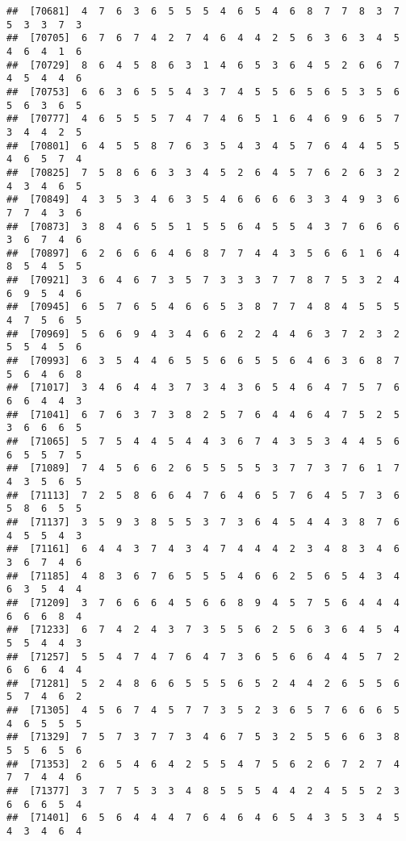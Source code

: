 \documentclass[
]{book}
\begin{document}
\begin{verbatim}
##  [70681]  4  7  6  3  6  5  5  5  4  6  5  4  6  8  7  7  8  3  7  5  3  3  7  3
##  [70705]  6  7  6  7  4  2  7  4  6  4  4  2  5  6  3  6  3  4  5  4  6  4  1  6
##  [70729]  8  6  4  5  8  6  3  1  4  6  5  3  6  4  5  2  6  6  7  4  5  4  4  6
##  [70753]  6  6  3  6  5  5  4  3  7  4  5  5  6  5  6  5  3  5  6  5  6  3  6  5
##  [70777]  4  6  5  5  5  7  4  7  4  6  5  1  6  4  6  9  6  5  7  3  4  4  2  5
##  [70801]  6  4  5  5  8  7  6  3  5  4  3  4  5  7  6  4  4  5  5  4  6  5  7  4
##  [70825]  7  5  8  6  6  3  3  4  5  2  6  4  5  7  6  2  6  3  2  4  3  4  6  5
##  [70849]  4  3  5  3  4  6  3  5  4  6  6  6  6  3  3  4  9  3  6  7  7  4  3  6
##  [70873]  3  8  4  6  5  5  1  5  5  6  4  5  5  4  3  7  6  6  6  3  6  7  4  6
##  [70897]  6  2  6  6  6  4  6  8  7  7  4  4  3  5  6  6  1  6  4  8  5  4  5  5
##  [70921]  3  6  4  6  7  3  5  7  3  3  3  7  7  8  7  5  3  2  4  6  9  5  4  6
##  [70945]  6  5  7  6  5  4  6  6  5  3  8  7  7  4  8  4  5  5  5  4  7  5  6  5
##  [70969]  5  6  6  9  4  3  4  6  6  2  2  4  4  6  3  7  2  3  2  5  5  4  5  6
##  [70993]  6  3  5  4  4  6  5  5  6  6  5  5  6  4  6  3  6  8  7  5  6  4  6  8
##  [71017]  3  4  6  4  4  3  7  3  4  3  6  5  4  6  4  7  5  7  6  6  6  4  4  3
##  [71041]  6  7  6  3  7  3  8  2  5  7  6  4  4  6  4  7  5  2  5  3  6  6  6  5
##  [71065]  5  7  5  4  4  5  4  4  3  6  7  4  3  5  3  4  4  5  6  6  5  5  7  5
##  [71089]  7  4  5  6  6  2  6  5  5  5  5  3  7  7  3  7  6  1  7  4  3  5  6  5
##  [71113]  7  2  5  8  6  6  4  7  6  4  6  5  7  6  4  5  7  3  6  5  8  6  5  5
##  [71137]  3  5  9  3  8  5  5  3  7  3  6  4  5  4  4  3  8  7  6  4  5  5  4  3
##  [71161]  6  4  4  3  7  4  3  4  7  4  4  4  2  3  4  8  3  4  6  3  6  7  4  6
##  [71185]  4  8  3  6  7  6  5  5  5  4  6  6  2  5  6  5  4  3  4  6  3  5  4  4
##  [71209]  3  7  6  6  6  4  5  6  6  8  9  4  5  7  5  6  4  4  4  6  6  6  8  4
##  [71233]  6  7  4  2  4  3  7  3  5  5  6  2  5  6  3  6  4  5  4  5  5  4  4  3
##  [71257]  5  5  4  7  4  7  6  4  7  3  6  5  6  6  4  4  5  7  2  6  6  6  4  4
##  [71281]  5  2  4  8  6  6  5  5  5  6  5  2  4  4  2  6  5  5  6  5  7  4  6  2
##  [71305]  4  5  6  7  4  5  7  7  3  5  2  3  6  5  7  6  6  6  5  4  6  5  5  5
##  [71329]  7  5  7  3  7  7  3  4  6  7  5  3  2  5  5  6  6  3  8  5  5  6  5  6
##  [71353]  2  6  5  4  6  4  2  5  5  4  7  5  6  2  6  7  2  7  4  7  7  4  4  6
##  [71377]  3  7  7  5  3  3  4  8  5  5  5  4  4  2  4  5  5  2  3  6  6  6  5  4
##  [71401]  6  5  6  4  4  4  7  6  4  6  4  6  5  4  3  5  3  4  5  4  3  4  6  4

\end{verbatim}
\end{document}
